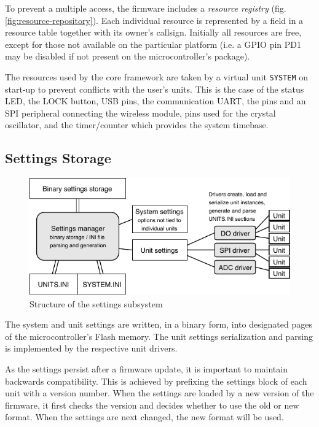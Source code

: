 To prevent a multiple access, the firmware includes a \textit{resource registry} (fig. \ref{fig:resource-repository}). Each individual resource is represented by a field in a resource table together with its owner's callsign. Initially all resources are free, except for those not available on the particular platform (i.e. a GPIO pin PD1 may be disabled if not present on the microcontroller's package).

The resources used by the core framework are taken by a virtual unit \verb|SYSTEM| on start-up to prevent conflicts with the user's units. This is the case of the status \gls{LED}, the LOCK button, \gls{USB} pins, the communication \gls{UART}, the pins and an \gls{SPI} peripheral connecting the wireless module, pins used for the crystal oscillator, and the timer/counter which provides the system timebase.


\subsection{Settings Storage} \label{sec:settings-storage}

\begin{figure}[h]
	\centering
	\includegraphics[scale=1] {img/settings-storage.pdf}
	\caption{\label{fig:settings-storage}Structure of the settings subsystem}
\end{figure}

The system and unit settings are written, in a binary form, into designated pages of the microcontroller's Flash memory. The unit settings serialization and parsing is implemented by the respective unit drivers.

As the settings persist after a firmware update, it is important to maintain backwards compatibility. This is achieved by prefixing the settings block of each unit with a version number. When the settings are loaded by a new version of the firmware, it first checks the version and decides whether to use the old or new format. When the settings are next changed, the new format will be used.

